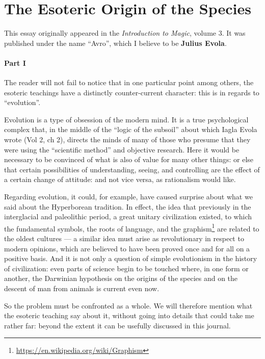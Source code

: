 \section{The Esoteric Origin of the Species}

\begin{quotex}
This essay originally appeared in the \emph{Introduction to Magic}, volume 3. It was published under the name ``Avro'', which I believe to be \textbf{Julius Evola}.
\end{quotex}

\paragraph{Part I}
The reader will not fail to notice that in one particular point among others, the esoteric teachings have a distinctly counter-current character: this is in regards to ``evolution''.

Evolution is a type of obsession of the modern mind. It is a true psychological complex that, in the middle of the ``logic of the subsoil'' about which Iagla Evola wrote (Vol 2, ch 2), directs the minds of many of those who presume that they were using the ``scientific method'' and objective research. Here it would be necessary to be convinced of what is also of value for many other things: or else that certain possibilities of understanding, seeing, and controlling are the effect of a certain change of attitude: and not vice versa, as rationalism would like.

Regarding evolution, it could, for example, have caused surprise about what we said about the Hyperborean tradition. In effect, the idea that previously in the interglacial and paleolithic period, a great unitary civilization existed, to which the fundamental symbols, the roots of language, and the graphism\footnote{\url{https://en.wikipedia.org/wiki/Graphism}} are related to the oldest cultures --- a similar idea must arise as revolutionary in respect to modern opinions, which are believed to have been proved once and for all on a positive basis. And it is not only a question of simple evolutionism in the history of civilization: even parts of science begin to be touched where, in one form or another, the Darwinian hypothesis on the origins of the species and on the descent of man from animals is current even now.

So the problem must be confronted as a whole. We will therefore mention what the esoteric teaching say about it, without going into details that could take me rather far: beyond the extent it can be usefully discussed in this journal.

